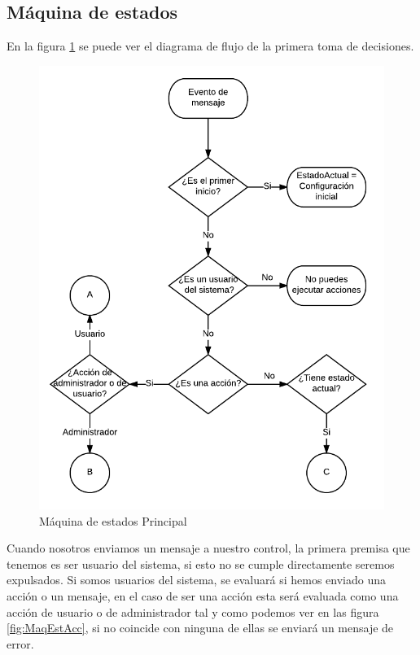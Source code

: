 \documentclass[10pt,journal,compsoc]{IEEEtran}
\begin{document}
\subsection{Máquina de estados}
En la figura \ref{fig:MaqEstPrin} se puede ver el diagrama de flujo de la primera toma de decisiones. 
\begin{figure}[h]
\centering
\includegraphics[scale=0.5]{MaqEstPrin}
\caption{Máquina de estados Principal}
\label{fig:MaqEstPrin}
\end{figure}

Cuando nosotros enviamos un mensaje a nuestro control, la primera premisa que tenemos es 
ser usuario del sistema, si esto no se cumple directamente seremos expulsados.
Si somos usuarios del sistema, se evaluará si hemos enviado una acción o un mensaje, en el 
caso de ser una acción esta será evaluada como una acción de usuario o de administrador tal y 
como podemos ver en las figura \ref{fig:MaqEstAcc}, si no coincide con ninguna de ellas se 
enviará un mensaje de error.
\end{document}
